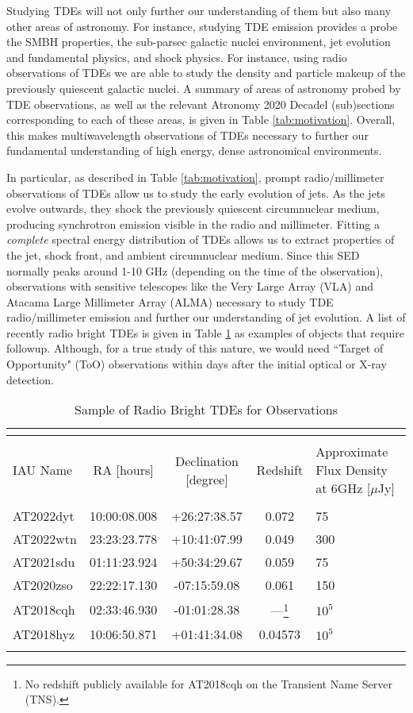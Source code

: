 \documentclass[12pt]{article}
\begin{document}
\indent Studying TDEs will not only further our understanding of them but also many other areas of astronomy. For instance, studying TDE emission provides a probe the SMBH properties, the sub-parsec galactic nuclei environment, jet evolution and fundamental physics, and shock physics. For instance, using radio observations of TDEs we are able to study the density and particle makeup of the previously quiescent galactic nuclei. A summary of areas of astronomy probed by TDE observations, as well as the relevant Atronomy 2020 Decadel (sub)sections corresponding to each of these areas, is given in Table \ref{tab:motivation}. Overall, this makes multiwavelength observations of TDEs necessary to further our fundamental understanding of high energy, dense astronomical environments. 

\indent In particular, as described in Table \ref{tab:motivation}, prompt radio/millimeter observations of TDEs allow us to study the early evolution of jets. As the jets evolve outwards, they shock the previously quiescent circumnuclear medium, producing synchrotron emission visible in the radio and millimeter. Fitting a \textit{complete} spectral energy distribution of TDEs allows us to extract properties of the jet, shock front, and ambient circumnuclear medium. Since this SED normally peaks around 1-10 GHz (depending on the time of the observation), observations with sensitive telescopes like the Very Large Array (VLA) and Atacama Large Millimeter Array (ALMA) necessary to study TDE radio/millimeter emission and further our understanding of jet evolution. A list of recently radio bright TDEs is given in Table \ref{tab:tdes} as examples of objects that require followup. Although, for a true study of this nature, we would need ``Target of Opportunity" (ToO) observations within days after the initial optical or X-ray detection.    
\begin{longtable}{l c c c p{4.5cm}}
    
    \caption{Sample of Radio Bright TDEs for Observations} \\
    \label{tab:tdes} \\
     
     \hline \\
     IAU Name & RA [hours] & Declination [degree] & Redshift & Approximate Flux Density at 6GHz [$\mu$Jy] \\
     \hline \\
     AT2022dyt & 10:00:08.008 & +26:27:38.57 & 0.072 & 75 \\
     AT2022wtn & 23:23:23.778 & +10:41:07.99	& 0.049 & 300 \\
     AT2021sdu & 01:11:23.924 & +50:34:29.67 & 0.059 & 75 \\
     AT2020zso & 22:22:17.130 & -07:15:59.08 & 0.061 & 150 \\
     AT2018cqh & 02:33:46.930 & -01:01:28.38 & ---\footnote{No redshift publicly available for AT2018cqh on the Transient Name Server (TNS).} & $10^5$\\
     AT2018hyz & 10:06:50.871 & +01:41:34.08 & 0.04573 & $10^5$\\
     \hline \\
\end{longtable}
\end{document}
